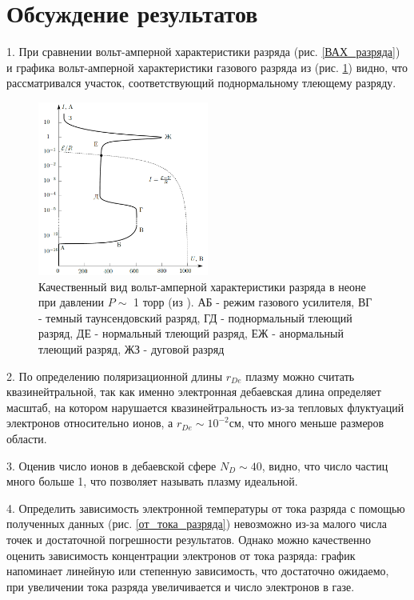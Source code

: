 \documentclass[a4paper,12pt]{article} %
\begin{document}
\section{Обсуждение результатов}


1.  При сравнении вольт-амперной характеристики разряда (рис. \ref{ВАХ_разряда}) и графика вольт-амперной характеристики газового разряда из \cite{labnik} (рис. \ref{приложение}) видно, что рассматривался участок, соответствующий поднормальному тлеющему разряду.

\begin{figure}[h!]
\begin{center}
\includegraphics[width=0.5\textwidth]{Приложение}
\caption{Качественный вид вольт-амперной характеристики разряда в неоне при давлении $P \sim$ 1 торр (из \cite{labnik}). АБ - режим газового усилителя, ВГ - темный таунсендовский разряд, ГД - поднормальный тлеющий разряд, ДЕ - нормальный тлеющий разряд, ЕЖ - анормальный тлеющий разряд, ЖЗ - дуговой разряд} \label{приложение}
\end{center}
\end{figure}

2. По определению поляризационной длины $r_{De}$ плазму можно считать квазинейтральной, так как именно электронная дебаевская длина определяет масштаб, на котором нарушается квазинейтральность из-за тепловых флуктуаций электронов относительно ионов, а $r_{De} \sim 10^{-2} см$, что много меньше размеров области.

3. Оценив число ионов в дебаевской сфере $N_D \sim 40$, видно, что число частиц много больше 1, что позволяет называть плазму идеальной.

4. Определить зависимость электронной температуры от тока разряда с помощью полученных данных (рис. \ref{от_тока_разряда}) невозможно из-за малого числа точек и достаточной погрешности результатов. Однако можно качественно оценить зависимость концентрации электронов от тока разряда: график напоминает линейную или степенную зависимость, что достаточно ожидаемо, при увеличении тока разряда увеличивается и число электронов в газе.
\end{document}
